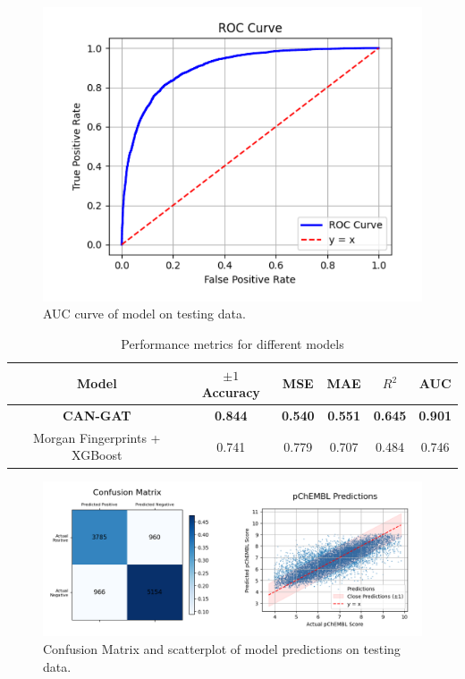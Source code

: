 \documentclass[fontsize=11pt]{article}
\begin{document}
\begin{figure}
    \centering
    \includegraphics[width=0.5\linewidth]{assets/auc.png}
    \caption{AUC curve of model on testing data.}
    \label{fig:enter-label}
\end{figure}


\begin{table}[h]
    \centering
    \begin{tabular}{|c|c|c|c|c|c|}
        \hline
        Model & $\pm 1$ Accuracy & MSE & MAE & $R^2$ & AUC \\ \hline
        \textbf{CAN-GAT} & \textbf{0.844} & \textbf{0.540} & \textbf{0.551} & \textbf{0.645} & \textbf{0.901} \\ \hline
        Morgan Fingerprints + XGBoost & 0.741 & 0.779 & 0.707 & 0.484 & 0.746 \\ \hline
    \end{tabular}
    \caption{Performance metrics for different models}
    \label{tab:performance_metrics}
\end{table}

\begin{figure}
    \centering
    \includegraphics[width=1\linewidth]{assets/matrix+scatterplot.png}
    \caption{Confusion Matrix and scatterplot of model predictions on testing data.}
    \label{fig:enter-label}
\end{figure}
\end{document}
